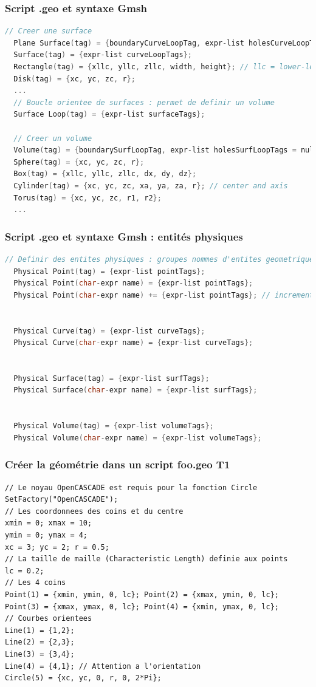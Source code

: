 \documentclass[aspectratio=169]{beamer}
\begin{document}
\begin{frame}[fragile]
\frametitle{Script .geo et syntaxe Gmsh}
\begin{lstlisting}[language=c++]
  // Creer une surface
  Plane Surface(tag) = {boundaryCurveLoopTag, expr-list holesCurveLoopTags = null};
  Surface(tag) = {expr-list curveLoopTags};
  Rectangle(tag) = {xllc, yllc, zllc, width, height}; // llc = lower-left corner
  Disk(tag) = {xc, yc, zc, r};
  ...
  // Boucle orientee de surfaces : permet de definir un volume
  Surface Loop(tag) = {expr-list surfaceTags};

  // Creer un volume
  Volume(tag) = {boundarySurfLoopTag, expr-list holesSurfLoopTags = null};
  Sphere(tag) = {xc, yc, zc, r};
  Box(tag) = {xllc, yllc, zllc, dx, dy, dz};
  Cylinder(tag) = {xc, yc, zc, xa, ya, za, r}; // center and axis
  Torus(tag) = {xc, yc, zc, r1, r2};
  ...
\end{lstlisting}
\end{frame}

\begin{frame}[fragile]
\frametitle{Script .geo et syntaxe Gmsh : entités physiques}
\begin{lstlisting}[language=c++]
  // Definir des entites physiques : groupes nommes d'entites geometriques
  Physical Point(tag) = {expr-list pointTags};
  Physical Point(char-expr name) = {expr-list pointTags};
  Physical Point(char-expr name) += {expr-list pointTags}; // incrementation


  Physical Curve(tag) = {expr-list curveTags};
  Physical Curve(char-expr name) = {expr-list curveTags};


  Physical Surface(tag) = {expr-list surfTags};
  Physical Surface(char-expr name) = {expr-list surfTags};


  Physical Volume(tag) = {expr-list volumeTags};
  Physical Volume(char-expr name) = {expr-list volumeTags};
\end{lstlisting}
\end{frame}

\begin{frame}[fragile]
\frametitle{Créer la géométrie dans un script foo.geo \hfill T1}
\begin{lstlisting}[frame=none,aboveskip=1mm]
// Le noyau OpenCASCADE est requis pour la fonction Circle
SetFactory("OpenCASCADE");
// Les coordonnees des coins et du centre
xmin = 0; xmax = 10;
ymin = 0; ymax = 4;
xc = 3; yc = 2; r = 0.5;
// La taille de maille (Characteristic Length) definie aux points
lc = 0.2;
// Les 4 coins
Point(1) = {xmin, ymin, 0, lc}; Point(2) = {xmax, ymin, 0, lc};
Point(3) = {xmax, ymax, 0, lc}; Point(4) = {xmin, ymax, 0, lc};
// Courbes orientees
Line(1) = {1,2};
Line(2) = {2,3};
Line(3) = {3,4};
Line(4) = {4,1}; // Attention a l'orientation
Circle(5) = {xc, yc, 0, r, 0, 2*Pi};
\end{lstlisting}
\end{frame}
\end{document}
